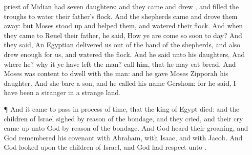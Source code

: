 {priest of
Midian had
seven
daughters: and they
came and
drew
{}, and
filled the
troughs to
water their
father’s
flock.
And the
shepherds
came and drove them
away: but
Moses stood
up and
helped them, and
watered their
flock.
And when they
came to
Reuel their
father, he
said,
How
{} ye are
come so
soon to
day?
And they
said, An
Egyptian
delivered us out of the
hand of the
shepherds, and also
drew
{}
enough for us, and
watered the
flock.
And he
said unto his
daughters, And where
{} he? why
{} it
{} ye have
left the
man?
call him, that he may
eat
bread.
And
Moses was
content to
dwell with the
man: and he
gave
Moses
Zipporah his
daughter.
And she
bare
{} a
son, and he
called his
name
Gershom: for he
said, I have been a
stranger in a
strange
land.
\par }{\PP {}¶ And it came to pass in
process of
time, that the
king of
Egypt
died: and the
children of
Israel
sighed by reason
of the
bondage, and they
cried, and their
cry came
up unto
God by reason of the
bondage.
And
God
heard their
groaning, and
God
remembered his
covenant with
Abraham, with
Isaac, and with
Jacob.
And
God
looked upon the
children of
Israel, and
God had
respect unto
{}.

}
